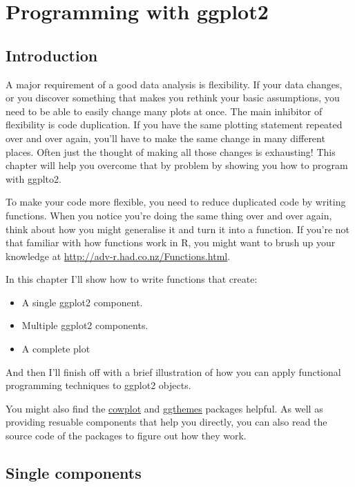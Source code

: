 \chapter{Programming with ggplot2}\label{cha:programming}

\section{Introduction}

A major requirement of a good data analysis is flexibility. If your data
changes, or you discover something that makes you rethink your basic
assumptions, you need to be able to easily change many plots at once.
The main inhibitor of flexibility is code duplication. If you have the
same plotting statement repeated over and over again, you'll have to
make the same change in many different places. Often just the thought of
making all those changes is exhausting! This chapter will help you
overcome that by problem by showing you how to program with ggplto2.

To make your code more flexible, you need to reduce duplicated code by
writing functions. When you notice you're doing the same thing over and
over again, think about how you might generalise it and turn it into a
function. If you're not that familiar with how functions work in R, you
might want to brush up your knowledge at
\url{http://adv-r.had.co.nz/Functions.html}.

In this chapter I'll show how to write functions that create:

\begin{itemize}
\itemsep1pt\parskip0pt
\item
  A single ggplot2 component.
\item
  Multiple ggplot2 components.
\item
  A complete plot
\end{itemize}

And then I'll finish off with a brief illustration of how you can apply
functional programming techniques to ggplot2 objects.

You might also find the
\href{https://github.com/wilkelab/cowplot}{cowplot} and
\href{https://github.com/jrnold/ggthemes}{ggthemes} packages helpful. As
well as providing resuable components that help you directly, you can
also read the source code of the packages to figure out how they work.

\section{Single components}


